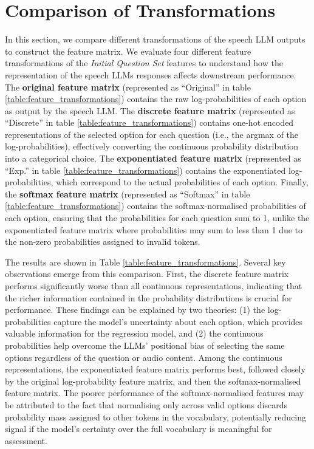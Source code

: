 \documentclass{report}
\begin{document}
\section{Comparison of Transformations}
\label{sec:comparison_of_transformations}
In this section, we compare different transformations of the speech LLM outputs to construct the feature matrix. We evaluate four different feature transformations of the \emph{Initial Question Set} features to understand how the representation of the speech LLMs responses affects downstream performance. The \textbf{original feature matrix} (represented as ``Original'' in table \ref{table:feature_transformations}) contains the raw log-probabilities of each option as output by the speech LLM. The \textbf{discrete feature matrix} (represented as ``Discrete'' in table \ref{table:feature_transformations}) contains one-hot encoded representations of the selected option for each question (i.e., the argmax of the log-probabilities), effectively converting the continuous probability distribution into a categorical choice. The \textbf{exponentiated feature matrix} (represented as ``Exp.'' in table \ref{table:feature_transformations}) contains the exponentiated log-probabilities, which correspond to the actual probabilities of each option. Finally, the \textbf{softmax feature matrix} (represented as ``Softmax'' in table \ref{table:feature_transformations}) contains the softmax-normalised probabilities of each option, ensuring that the probabilities for each question sum to 1, unlike the exponentiated feature matrix where probabilities may sum to less than 1 due to the non-zero probabilities assigned to invalid tokens.

The results are shown in Table \ref{table:feature_transformations}. Several key observations emerge from this comparison. First, the discrete feature matrix performs significantly worse than all continuous representations, indicating that the richer information contained in the probability distributions is crucial for performance. These findings can be explained by two theories: (1) the log-probabilities capture the model's uncertainty about each option, which provides valuable information for the regression model, and (2) the continuous probabilities help overcome the LLMs' positional bias \citep{liusie2023mitigatingwordbiaszeroshot} of selecting the same options regardless of the question or audio content. Among the continuous representations, the exponentiated feature matrix performs best, followed closely by the original log-probability feature matrix, and then the softmax-normalised feature matrix. The poorer performance of the softmax-normalised features may be attributed to the fact that normalising only across valid options discards probability mass assigned to other tokens in the vocabulary, potentially reducing signal if the model's certainty over the full vocabulary is meaningful for assessment.
\end{document}
